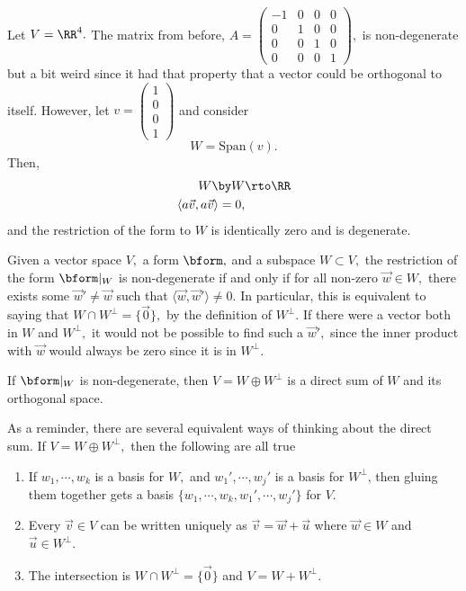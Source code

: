 \begin{example}
Let $V = \RR^4.$ The matrix from before, $A = \begin{pmatrix}
-1 & 0 & 0 & 0 \\
0 & 1 & 0 & 0 \\
0 & 0 & 1 & 0 \\
0 & 0 & 0 & 1
\end{pmatrix},$ is non-degenerate but a bit weird since it had that property that a vector could be orthogonal to itself. However, let $v = \begin{pmatrix}1 \\ 0 \\ 0 \\ 1\end{pmatrix}$ and consider
\[
W = \text{Span}(v).
\]
Then, 
\begin{align*}
W \by W &\rto \RR \\
\langle a\vec{v}, a\vec{v}\rangle = 0,
\end{align*}
and the restriction of the form to $W$ is identically zero and is degenerate.
\end{example}

Given a vector space $V,$ a form $\bform,$ and a subspace $W \subset V,$ the restriction of the form $\bform|_W$ is non-degenerate if and only if for all non-zero $\vec{w} \in W,$ there exists some $\vec{w}' \neq \vec{w}$ such that $\langle \vec{w}, \vec{w}'\rangle \neq 0$. In particular, this is equivalent to saying that $W \cap W^{\perp} = \{\vec{0}\},$ by the definition of $W^{\perp}.$ If there were a vector both in $W$ and $W^{\perp},$ it would not be possible to find such a $\vec{w}',$ since the inner product with $\vec{w}$ would always be zero since it is in $W^{\perp}.$ %

\begin{theorem}
If $\bform|_W$ is non-degenerate, then $V = W \oplus W^{\perp}$ is a direct sum of $W$ and its orthogonal space. 
\end{theorem}

As a reminder, there are several equivalent ways of thinking about the direct sum. If $V = W \oplus W^\perp,$ then the following are all true \begin{enumerate}
    \item If $w_1, \cdots, w_k$ is a basis for $W,$ and $w_1', \cdots, w_j'$ is a basis for $W^{\perp}$, then gluing them together gets a basis $\{w_1, \cdots, w_k, w_1', \cdots, w_j'\}$ for $V.$
    \item Every $\vec{v} \in V$ can be written uniquely as $\vec{v} = \vec{w} + \vec{u}$ where $\vec{w} \in W$ and $\vec{u} \in W^{\perp}.$
    \item The intersection is $W \cap W^{\perp} = \{\vec{0}\}$ and $V = W + W^{\perp}.$
\end{enumerate}

